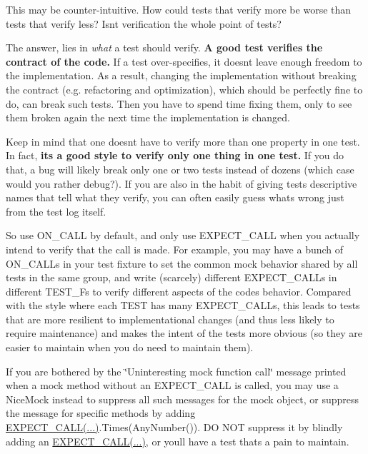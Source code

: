 This may be counter-\/intuitive. How could tests that verify more be worse than tests that verify less? Isn\textquotesingle{}t verification the whole point of tests?

The answer, lies in {\itshape what} a test should verify. {\bfseries{A good test verifies the contract of the code.}} If a test over-\/specifies, it doesn\textquotesingle{}t leave enough freedom to the implementation. As a result, changing the implementation without breaking the contract (e.\+g. refactoring and optimization), which should be perfectly fine to do, can break such tests. Then you have to spend time fixing them, only to see them broken again the next time the implementation is changed.

Keep in mind that one doesn\textquotesingle{}t have to verify more than one property in one test. In fact, {\bfseries{it\textquotesingle{}s a good style to verify only one thing in one test.}} If you do that, a bug will likely break only one or two tests instead of dozens (which case would you rather debug?). If you are also in the habit of giving tests descriptive names that tell what they verify, you can often easily guess what\textquotesingle{}s wrong just from the test log itself.

So use {\ttfamily O\+N\+\_\+\+C\+A\+LL} by default, and only use {\ttfamily E\+X\+P\+E\+C\+T\+\_\+\+C\+A\+LL} when you actually intend to verify that the call is made. For example, you may have a bunch of {\ttfamily O\+N\+\_\+\+C\+A\+LL}s in your test fixture to set the common mock behavior shared by all tests in the same group, and write (scarcely) different {\ttfamily E\+X\+P\+E\+C\+T\+\_\+\+C\+A\+LL}s in different {\ttfamily T\+E\+S\+T\+\_\+F}s to verify different aspects of the code\textquotesingle{}s behavior. Compared with the style where each {\ttfamily T\+E\+ST} has many {\ttfamily E\+X\+P\+E\+C\+T\+\_\+\+C\+A\+LL}s, this leads to tests that are more resilient to implementational changes (and thus less likely to require maintenance) and makes the intent of the tests more obvious (so they are easier to maintain when you do need to maintain them).

If you are bothered by the \char`\"{}\+Uninteresting mock function call\char`\"{} message printed when a mock method without an {\ttfamily E\+X\+P\+E\+C\+T\+\_\+\+C\+A\+LL} is called, you may use a {\ttfamily Nice\+Mock} instead to suppress all such messages for the mock object, or suppress the message for specific methods by adding {\ttfamily \mbox{\hyperlink{_obj__test_2lib_2googletest-release-1_88_81_2googlemock_2include_2gmock_2gmock-spec-builders_8h_a535a6156de72c1a2e25a127e38ee5232}{E\+X\+P\+E\+C\+T\+\_\+\+C\+A\+L\+L(...)}}.Times(\+Any\+Number())}. DO N\+OT suppress it by blindly adding an {\ttfamily \mbox{\hyperlink{_obj__test_2lib_2googletest-release-1_88_81_2googlemock_2include_2gmock_2gmock-spec-builders_8h_a535a6156de72c1a2e25a127e38ee5232}{E\+X\+P\+E\+C\+T\+\_\+\+C\+A\+L\+L(...)}}}, or you\textquotesingle{}ll have a test that\textquotesingle{}s a pain to maintain.

